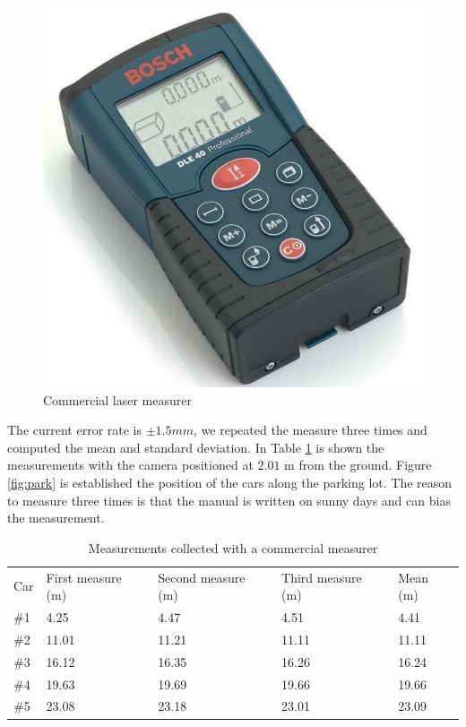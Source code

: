 \begin{figure}[H]
\centering
\includegraphics[scale=0.3]{imagens/trena.jpg}
\caption{Commercial laser measurer}
\label{fig:laser_meas}
\end{figure}

The current error rate is $ \pm 1.5 mm $, we repeated the measure three times and computed the mean and standard deviation. In Table \ref{tab:tab_measure} is shown the measurements with the camera positioned at $2.01$ m from the ground. Figure \ref{fig:park} is established the position of the cars along the parking lot. The reason to measure three times is that the manual is written on sunny days and can bias the measurement. 



\begin{table}[H]
\centering
\caption{Measurements collected with a commercial measurer}
\begin{tabular}{l|l|l|l|l} 
\toprule
Car & First measure (m) & Second measure (m) & Third measure (m) & Mean (m) \\
\#1   & 4.25          & 4.47           & 4.51           & 4.41 \\
\#2   & 11.01         & 11.21          & 11.11          & 11.11\\
\#3   & 16.12         & 16.35          & 16.26          & 16.24\\
\#4   & 19.63         & 19.69          & 19.66          & 19.66\\
\#5   & 23.08         & 23.18          & 23.01          & 23.09\\
\bottomrule
\end{tabular}
\label{tab:tab_measure}
\end{table} 


